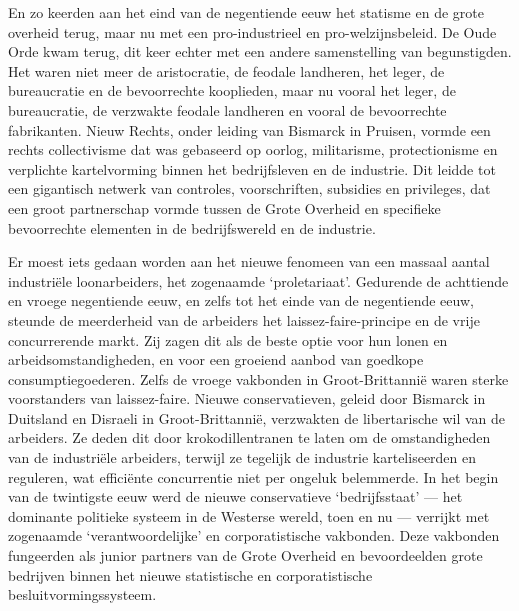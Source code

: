 \documentclass[
  a5paper,
  smalldemyvopaper,10pt,twoside,onecolumn,openright,extrafontsizes,hidelinks]{memoir}
\begin{document}
En zo keerden aan het eind van de negentiende eeuw het statisme en de
grote overheid terug, maar nu met een pro-industrieel en
pro-welzijnsbeleid. De Oude Orde kwam terug, dit keer echter met een
andere samenstelling van begunstigden. Het waren niet meer de
aristocratie, de feodale landheren, het leger, de bureaucratie en de
bevoorrechte kooplieden, maar nu vooral het leger, de bureaucratie, de
verzwakte feodale landheren en vooral de bevoorrechte fabrikanten. Nieuw
Rechts, onder leiding van Bismarck in Pruisen, vormde een rechts
collectivisme dat was gebaseerd op oorlog, militarisme, protectionisme
en verplichte kartelvorming binnen het bedrijfsleven en de industrie.
Dit leidde tot een gigantisch netwerk van controles, voorschriften,
subsidies en privileges, dat een groot partnerschap vormde tussen de
Grote Overheid en specifieke bevoorrechte elementen in de bedrijfswereld
en de industrie.

Er moest iets gedaan worden aan het nieuwe fenomeen van een massaal
aantal industriële loonarbeiders, het zogenaamde `proletariaat'.
Gedurende de achttiende en vroege negentiende eeuw, en zelfs tot het
einde van de negentiende eeuw, steunde de meerderheid van de arbeiders
het laissez-faire-principe en de vrije concurrerende markt. Zij zagen
dit als de beste optie voor hun lonen en arbeidsomstandigheden, en voor
een groeiend aanbod van goedkope consumptiegoederen. Zelfs de vroege
vakbonden in Groot-Brittannië waren sterke voorstanders van
laissez-faire. Nieuwe conservatieven, geleid door Bismarck in Duitsland
en Disraeli in Groot-Brittannië, verzwakten de libertarische wil van de
arbeiders. Ze deden dit door krokodillentranen te laten om de
omstandigheden van de industriële arbeiders, terwijl ze tegelijk de
industrie karteliseerden en reguleren, wat efficiënte concurrentie niet
per ongeluk belemmerde. In het begin van de twintigste eeuw werd de
nieuwe conservatieve `bedrijfsstaat' --- het dominante politieke systeem
in de Westerse wereld, toen en nu --- verrijkt met zogenaamde
`verantwoordelijke' en corporatistische vakbonden. Deze vakbonden
fungeerden als junior partners van de Grote Overheid en bevoordeelden
grote bedrijven binnen het nieuwe statistische en corporatistische
besluitvormingssysteem.
\end{document}
